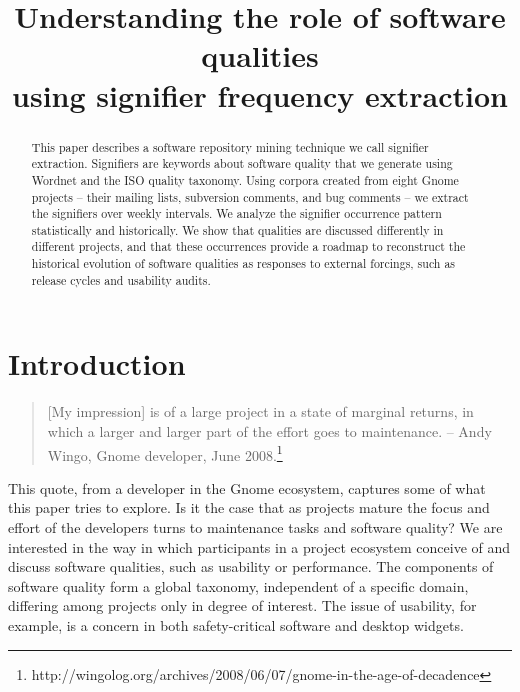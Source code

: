 \documentclass[conference, compsoc]{IEEEtran}
\begin{document}

 
\title{Understanding the role of software qualities\\ using signifier frequency extraction}

\author{
}

\maketitle

\begin{abstract}
This paper describes a software repository mining technique we call signifier extraction. Signifiers are keywords about software quality that we generate using Wordnet and the ISO quality taxonomy. Using corpora created from eight Gnome projects -- their mailing lists, subversion comments, and bug comments -- we extract the signifiers over weekly intervals. We analyze the signifier occurrence pattern statistically and historically. We show that qualities are discussed differently in different projects, and that these occurrences provide a roadmap to reconstruct the historical evolution of software qualities as responses to external forcings, such as release cycles and usability audits. %
\end{abstract}
\vspace{-2mm}
\section{Introduction}\label{sect:introduction}%
\vspace{-2mm}
\begin{quote}[My impression] is of a large project in a state of marginal returns, in which a larger and larger part of the effort goes to maintenance. -- Andy Wingo, Gnome developer, June 2008.\footnote{http://wingolog.org/archives/2008/06/07/gnome-in-the-age-of-decadence}\end{quote}
	This quote, from a developer in the Gnome ecosystem, captures some of what this paper tries to explore. Is it the case that as projects mature the focus and effort of the developers turns to maintenance tasks and software quality? 
We are interested in the way in which participants in a project ecosystem conceive of and discuss software qualities, such as usability or performance. The components of software quality form a global taxonomy, independent of a specific domain, differing among projects only in degree of interest. The issue of usability, for example, is a concern in both safety-critical software and desktop widgets. 
\end{document}
